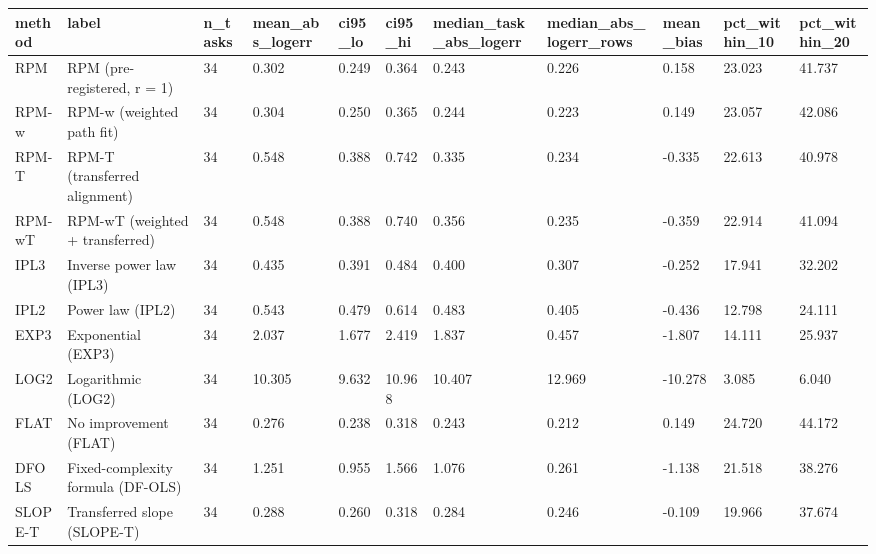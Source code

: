 \begin{tabular}{lllllllllll}
\hline
method & label & n\_tasks & mean\_abs\_logerr & ci95\_lo & ci95\_hi & median\_task\_abs\_logerr & median\_abs\_logerr\_rows & mean\_bias & pct\_within\_10 & pct\_within\_20 \\
\hline
RPM & RPM (pre-registered, r = 1) & 34 & 0.302 & 0.249 & 0.364 & 0.243 & 0.226 & 0.158 & 23.023 & 41.737 \\
RPM-w & RPM-w (weighted path fit) & 34 & 0.304 & 0.250 & 0.365 & 0.244 & 0.223 & 0.149 & 23.057 & 42.086 \\
RPM-T & RPM-T (transferred alignment) & 34 & 0.548 & 0.388 & 0.742 & 0.335 & 0.234 & -0.335 & 22.613 & 40.978 \\
RPM-wT & RPM-wT (weighted + transferred) & 34 & 0.548 & 0.388 & 0.740 & 0.356 & 0.235 & -0.359 & 22.914 & 41.094 \\
IPL3 & Inverse power law (IPL3) & 34 & 0.435 & 0.391 & 0.484 & 0.400 & 0.307 & -0.252 & 17.941 & 32.202 \\
IPL2 & Power law (IPL2) & 34 & 0.543 & 0.479 & 0.614 & 0.483 & 0.405 & -0.436 & 12.798 & 24.111 \\
EXP3 & Exponential (EXP3) & 34 & 2.037 & 1.677 & 2.419 & 1.837 & 0.457 & -1.807 & 14.111 & 25.937 \\
LOG2 & Logarithmic (LOG2) & 34 & 10.305 & 9.632 & 10.968 & 10.407 & 12.969 & -10.278 & 3.085 & 6.040 \\
FLAT & No improvement (FLAT) & 34 & 0.276 & 0.238 & 0.318 & 0.243 & 0.212 & 0.149 & 24.720 & 44.172 \\
DFOLS & Fixed-complexity formula (DF-OLS) & 34 & 1.251 & 0.955 & 1.566 & 1.076 & 0.261 & -1.138 & 21.518 & 38.276 \\
SLOPE-T & Transferred slope (SLOPE-T) & 34 & 0.288 & 0.260 & 0.318 & 0.284 & 0.246 & -0.109 & 19.966 & 37.674 \\
\hline
\end{tabular}
